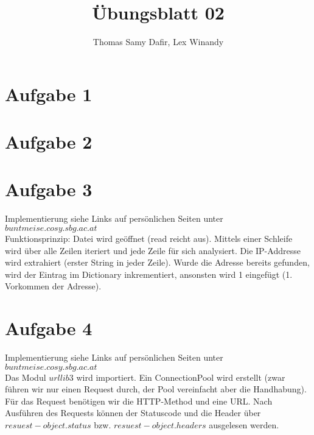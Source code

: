 \documentclass[12pt, a4paper]{report}
\title{Übungsblatt 02}
\author{Thomas Samy Dafir, Lex Winandy}
\date{}
\begin{document}
\maketitle

\section*{Aufgabe 1}




\section*{Aufgabe 2}

\section*{Aufgabe 3}

Implementierung siehe Links auf persönlichen Seiten unter $buntmeise.cosy.sbg.ac.at$\\
Funktionsprinzip: Datei wird geöffnet (read reicht aus). Mittels einer Schleife wird über alle Zeilen iteriert und jede Zeile
für sich analysiert. Die IP-Addresse wird extrahiert (erster String in jeder Zeile). Wurde die Adresse bereits gefunden, wird der Eintrag im Dictionary inkrementiert, ansonsten wird 1 eingefügt (1. Vorkommen der Adresse).

\section*{Aufgabe 4}
Implementierung siehe Links auf persönlichen Seiten unter $buntmeise.cosy.sbg.ac.at$\\
Das Modul $urllib3$ wird importiert. Ein ConnectionPool wird erstellt (zwar führen wir nur einen Request durch, der Pool vereinfacht aber die Handhabung). Für das Request benötigen wir die HTTP-Method und eine URL. Nach Ausführen des Requests können der Statuscode und die Header über $resuest-object.status$ bzw. $resuest-object.headers$ ausgelesen werden.
\end{document}
